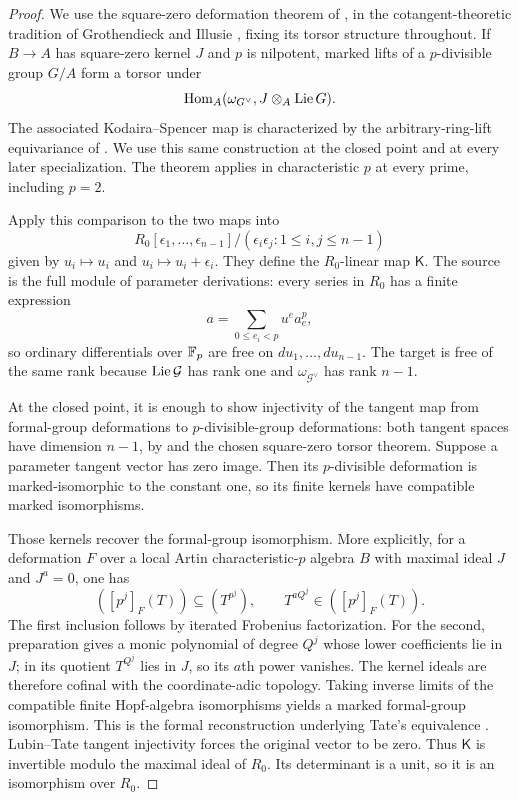\begin{proof}
We use the square-zero deformation theorem of
\cite[Theorem~5.1]{Lau08}, in the cotangent-theoretic tradition of
Grothendieck and Illusie
\cite[Theorem~4.4 and Corollary~4.7]{Illusie85}, fixing its torsor structure
throughout.  If $B\to A$ has square-zero
kernel $J$ and $p$ is nilpotent, marked lifts of a $p$-divisible group $G/A$
form a torsor under
\[
 \operatorname{Hom}_A(\omega_{G^\vee},J\otimes_A\operatorname{Lie} G).
\]
The associated Kodaira--Spencer map is characterized by the
arbitrary-ring-lift equivariance of \cite[Equation~(5.1)]{Lau08}.
We use this same construction at the closed point and at every later
specialization.  The theorem applies in characteristic $p$ at every
prime, including $p=2$.

Apply this comparison to the two maps into
\[
 R_0[\epsilon_1,\ldots,\epsilon_{n-1}]/
       (\epsilon_i\epsilon_j:1\le i,j\le n-1)
\]
given by $u_i\mapsto u_i$ and $u_i\mapsto u_i+\epsilon_i$.
They define the $R_0$-linear map $\mathsf K$.
The source is the full module of parameter derivations: every series in
$R_0$ has a finite expression
\[
 a=\sum_{0\le e_i<p}u^e a_e^p,
\]
so ordinary differentials over $\mathbb F_p$ are free on $du_1,\ldots,du_{n-1}$.
The target is free of the same rank because $\operatorname{Lie}\mathcal G$ has rank one
and $\omega_{\mathcal G^\vee}$ has rank $n-1$.

At the closed point, it is enough to show injectivity of the tangent
map from formal-group deformations to $p$-divisible-group deformations:
both tangent spaces have dimension $n-1$, by
\cite[Proposition~2.6 and Theorem~3.1]{LT66} and the chosen square-zero
torsor theorem.  Suppose a parameter tangent vector has zero image.
Then its $p$-divisible deformation is marked-isomorphic to the constant
one, so its finite kernels have compatible marked isomorphisms.

Those kernels recover the formal-group isomorphism.  More explicitly,
for a deformation $F$ over a local Artin characteristic-$p$ algebra $B$
with maximal ideal $J$ and $J^a=0$, one has
\[
 ([p^j]_F(T))\subseteq(T^{p^j}),\qquad
 T^{aQ^j}\in([p^j]_F(T)).
\]
The first inclusion follows by iterated Frobenius factorization.
For the second, preparation gives a monic polynomial of degree $Q^j$
whose lower coefficients lie in $J$; in its quotient $T^{Q^j}$ lies
in $J$, so its $a$th power vanishes.  The kernel ideals are therefore
cofinal with the coordinate-adic topology.  Taking inverse limits of
the compatible finite Hopf-algebra isomorphisms yields a marked
formal-group isomorphism.  This is the formal reconstruction underlying
Tate's equivalence \cite[Section~2.2, Proposition~1 and Lemma~0]{Tate67}.
Lubin--Tate tangent injectivity forces the original vector to be zero.
Thus $\mathsf K$ is invertible modulo the maximal ideal of $R_0$.
Its determinant is a unit, so it is an isomorphism over $R_0$.


\end{proof}
